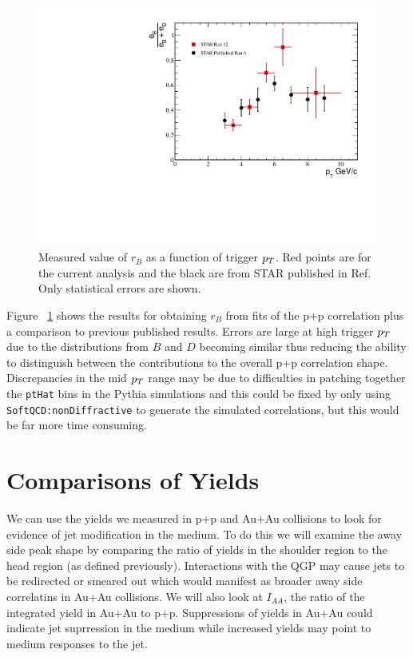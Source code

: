 \begin{figure}[htbp]
\begin{center}
\includegraphics[scale=.75]{Plots/Correlations/BD_ratio.pdf}
\end{center}
\caption[B/D Ratio]{Measured value of $r_B$ as a function of trigger $p_{T}$. Red points are for the current analysis and the black are from STAR published in Ref. Only statistical errors are shown.}
\label{fig:BDRatio}
\end{figure}

Figure ~\ref{fig:BDRatio} shows the results for obtaining $r_B$ from fits of the p+p correlation plus a comparison to previous published results. Errors are large at high trigger $p_{T}$ due to the distributions from $B$ and $D$ becoming similar thus reducing the ability to distinguish between the contributions to the overall p+p correlation shape. Discrepancies in the mid $p_{T}$ range may be due to difficulties in patching together the \texttt{ptHat} bins in the Pythia simulations and this could be fixed by only using \texttt{SoftQCD:nonDiffractive} to generate the simulated correlations, but this would be far more time consuming. 

\section{Comparisons of Yields}

We can use the yields we measured in p+p and Au+Au collisions to look for evidence of jet modification in the medium. To do this we will examine the away side peak shape by comparing the ratio of yields in the shoulder region to the head region (as defined previously). Interactions with the QGP may cause jets to be redirected or smeared out which would manifest as broader away side correlatins in Au+Au collisions. We will also look at $I_{AA}$, the ratio of the integrated yield in Au+Au to p+p. Suppressions of yields in Au+Au could indicate jet suprression in the medium while increased yields may point to medium responses to the jet.


